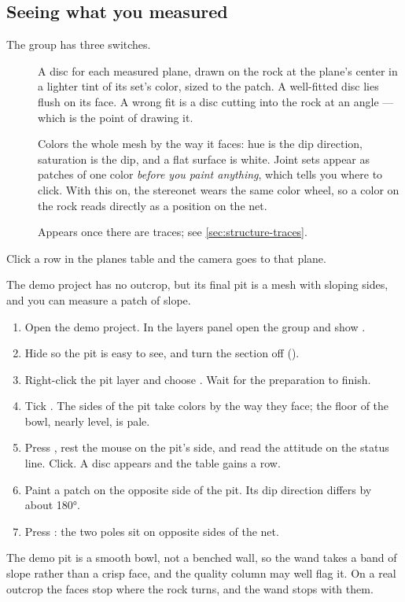 \subsection{Seeing what you measured}

The  group has three switches.

\begin{description}
\item[] A disc for each measured plane, drawn on the rock at the plane's center in a lighter tint of its set's color, sized to the patch. A well-fitted disc lies flush on its face. A wrong fit is a disc cutting into the rock at an angle — which is the point of drawing it.
\item[] Colors the whole mesh by the way it faces: hue is the dip direction, saturation is the dip, and a flat surface is white. Joint sets appear as patches of one color \emph{before you paint anything}, which tells you where to click. With this on, the stereonet wears the same color wheel, so a color on the rock reads directly as a position on the net.
\item[] Appears once there are traces; see \cref{sec:structure-traces}.
\end{description}

Click a row in the planes table and the camera goes to that plane.

\begin{tryit}
The demo project has no outcrop, but its final pit is a mesh with sloping sides, and you can measure a patch of slope.
\begin{enumerate}
\item Open the demo project. In the layers panel open the  group and show .
\item Hide  so the pit is easy to see, and turn the section off ().
\item Right-click the pit layer and choose . Wait for the preparation to finish.
\item Tick . The sides of the pit take colors by the way they face; the floor of the bowl, nearly level, is pale.
\item Press , rest the mouse on the pit's side, and read the attitude on the status line. Click. A disc appears and the table gains a row.
\item Paint a patch on the opposite side of the pit. Its dip direction differs by about 180°.
\item Press : the two poles sit on opposite sides of the net.
\end{enumerate}
The demo pit is a smooth bowl, not a benched wall, so the wand takes a band of slope rather than a crisp face, and the quality column may well flag it. On a real outcrop the faces stop where the rock turns, and the wand stops with them.
\end{tryit}

